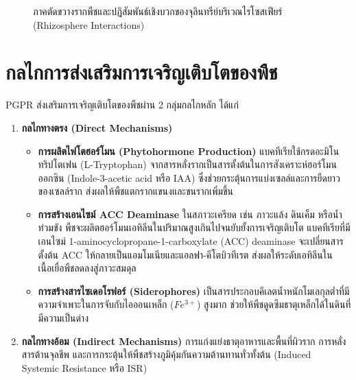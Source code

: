 \begin{figure}[H]
\caption{ภาคตัดขวางรากพืชและปฏิสัมพันธ์เชิงบวกของจุลินทรีย์บริเวณไรโซสเฟียร์ (Rhizosphere Interactions)}
\label{fig:rhizosphere_diagram}
\end{figure}

\section{กลไกการส่งเสริมการเจริญเติบโตของพืช}

PGPR ส่งเสริมการเจริญเติบโตของพืชผ่าน 2 กลุ่มกลไกหลัก ได้แก่
\begin{enumerate}
    \item \textbf{กลไกทางตรง (Direct Mechanisms)}
    \begin{itemize}
        \item \textbf{การผลิตไฟโตฮอร์โมน (Phytohormone Production)} แบคทีเรียใช้กรดอะมิโนทริปโตเฟน (L-Tryptophan) จากสารหลั่งรากเป็นสารตั้งต้นในการสังเคราะห์ฮอร์โมนออกซิน (Indole-3-acetic acid หรือ IAA) ซึ่งช่วยกระตุ้นการแบ่งเซลล์และการยืดยาวของเซลล์ราก ส่งผลให้พืชแตกรากแขนงและขนรากเพิ่มขึ้น
        \item \textbf{การสร้างเอนไซม์ ACC Deaminase} ในสภาวะเครียด เช่น ภาวะแล้ง ดินเค็ม หรือน้ำท่วมขัง พืชจะผลิตฮอร์โมนเอทิลีนในปริมาณสูงเกินไปจนยับยั้งการเจริญเติบโต แบคทีเรียที่มีเอนไซม์ 1-aminocyclopropane-1-carboxylate (ACC) deaminase จะเปลี่ยนสารตั้งต้น ACC ให้กลายเป็นแอมโมเนียและแอลฟา-คีโตบิวทีเรต ส่งผลให้ระดับเอทิลีนในเนื้อเยื่อพืชลดลงสู่ภาวะสมดุล
        \item \textbf{การสร้างสารไซเดอโรฟอร์ (Siderophores)} เป็นสารประกอบคีเลตน้ำหนักโมเลกุลต่ำที่มีความจำเพาะในการจับกับไอออนเหล็ก ($Fe^{3+}$) สูงมาก ช่วยให้พืชดูดซึมธาตุเหล็กได้ในดินที่มีความเป็นด่าง
    \end{itemize}
    \item \textbf{กลไกทางอ้อม (Indirect Mechanisms)} การแก่งแย่งธาตุอาหารและพื้นที่ผิวราก การหลั่งสารต้านจุลชีพ และการกระตุ้นให้พืชสร้างภูมิคุ้มกันความต้านทานทั่วทั้งต้น (Induced Systemic Resistance หรือ ISR)
\end{enumerate}

